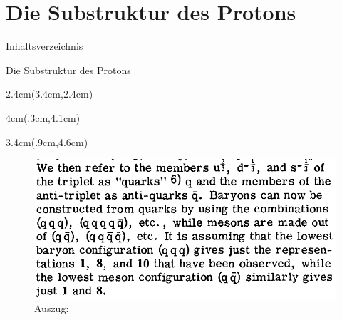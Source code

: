 \documentclass[t,9pt]{beamer}
\newcommand{\highlight}[3]{ \begin{textblock*}{#1}(#2,#3) \begin{tcolorbox} [enhanced,opacityfill=.1,colback=blue] \end{tcolorbox} \end{textblock*} } %
\begin{document}
        \section{Die Substruktur des Protons}

        \begin{frame}{Inhaltsverzeichnis}
                \tableofcontents[currentsection]
        \end{frame}

        \begin{frame}{Die Substruktur des Protons}
                \highlight{2.4cm}{3.4cm}{2.4cm}
                \highlight{4cm}{.3cm}{4.1cm}
                \highlight{3.4cm}{.9cm}{4.6cm}
                \begin{figure}
                        \includegraphics[width=\textwidth]{prosi_gell_mann_quarks.png}
                        \caption{Auszug:\cite{Gellmann1964}}
                \end{figure}
        \end{frame}

\end{document}
